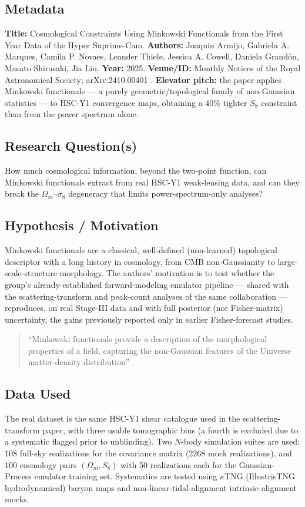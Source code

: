 \documentclass[11pt]{article}
\begin{document}
\subsection{Metadata}
\textbf{Title:} Cosmological Constraints Using Minkowski Functionals from the First Year Data of the Hyper Suprime-Cam. \textbf{Authors:} Joaquin Armijo, Gabriela A. Marques, Camila P. Novaes, Leander Thiele, Jessica A. Cowell, Daniela Grandón, Masato Shirasaki, Jia Liu. \textbf{Year:} 2025. \textbf{Venue/ID:} Monthly Notices of the Royal Astronomical Society; arXiv:2410.00401 \citep{armijo2025minkowski}. \textbf{Elevator pitch:} the paper applies Minkowski functionals — a purely geometric/topological family of non-Gaussian statistics — to HSC-Y1 convergence maps, obtaining a 40\% tighter $S_8$ constraint than from the power spectrum alone.

\subsection{Research Question(s)}
How much cosmological information, beyond the two-point function, can Minkowski functionals extract from real HSC-Y1 weak-lensing data, and can they break the $\Omega_m$–$\sigma_8$ degeneracy that limits power-spectrum-only analyses?

\subsection{Hypothesis / Motivation}
Minkowski functionals are a classical, well-defined (non-learned) topological descriptor with a long history in cosmology, from CMB non-Gaussianity to large-scale-structure morphology. The authors' motivation is to test whether the group's already-established forward-modeling emulator pipeline — shared with the scattering-transform and peak-count analyses of the same collaboration — reproduces, on real Stage-III data and with full posterior (not Fisher-matrix) uncertainty, the gains previously reported only in earlier Fisher-forecast studies.

\begin{quote}
\enquote{Minkowski functionals provide a description of the morphological properties of a field, capturing the non-Gaussian features of the Universe matter-density distribution} \citep[p.~1]{armijo2025minkowski}.
\end{quote}

\subsection{Data Used}
The real dataset is the same HSC-Y1 shear catalogue used in the scattering-transform paper, with three usable tomographic bins (a fourth is excluded due to a systematic flagged prior to unblinding). Two $N$-body simulation suites are used: 108 full-sky realizations for the covariance matrix (2268 mock realizations), and 100 cosmology pairs $(\Omega_m,S_8)$ with 50 realizations each for the Gaussian-Process emulator training set. Systematics are tested using $\kappa$TNG (IllustrisTNG hydrodynamical) baryon maps and non-linear-tidal-alignment intrinsic-alignment mocks.
\end{document}

